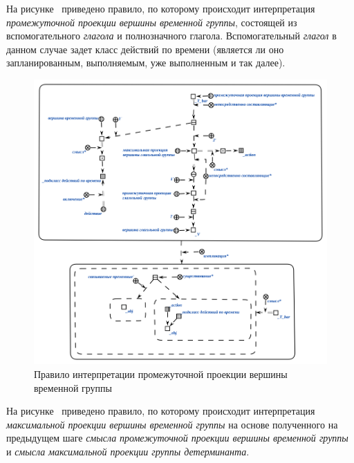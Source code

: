 На рисунке~\textit{} приведено правило, по которому происходит интерпретация \textit{промежуточной проекции вершины временной группы}, состоящей из вспомогательного \textit{глагола} и полнозначного глагола.
Вспомогательный \textit{глагол} в данном случае задет класс действий по времени (является ли оно запланированным, выполняемым, уже выполненным и так далее).

\begin{figure}[h]
    \centering
    \includegraphics[scale=0.8]{images/part2/chapter_lang/d_sem_5}
    \caption{Правило интерпретации промежуточной проекции вершины временной группы}
    \label{fig:d_sem_5}
\end{figure}

На рисунке~\textit{} приведено правило, по которому происходит интерпретация \textit{максимальной проекции вершины временной группы} на основе полученного на предыдущем шаге \textit{смысла} \textit{промежуточной проекции вершины временной группы} и \textit{смысла} \textit{максимальной проекции группы детерминанта}.

